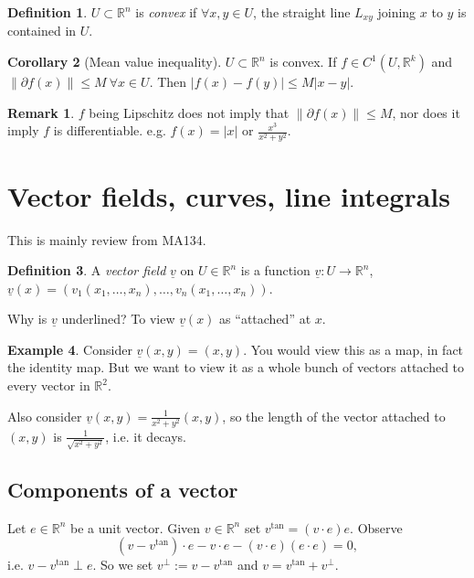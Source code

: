 \documentclass[a4paper]{article}
\theoremstyle{definition}
\newtheorem{defn}{Definition}[subsection]
\newtheorem{coro}[defn]{Corollary}
\newtheorem{eg}[defn]{Example}
\newtheorem*{remark}{Remark}
\begin{document}
\begin{defn}
$U\subset \mathbb R^n$ is \textit{convex} if $\forall x,y\in U$, the straight line $L_{xy}$ joining $x$ to $y$ is contained in $U$.
\end{defn}
\begin{coro}[Mean value inequality]
$U\subset \mathbb R^n$ is convex. If $f\in C^1(U,\mathbb R^k)$ and $\|\partial f(x)\| \leq M \ \forall x\in U$. Then $|f(x)-f(y)|\leq M|x-y|$.
\end{coro}
\begin{remark}
$f$ being Lipschitz does not imply that $\|\partial f(x)\| \leq M$, nor does it imply $f$ is differentiable. e.g. $f(x)=|x|$ or $\frac{x^3}{x^2+y^2}$.
\end{remark}

\section{Vector fields, curves, line integrals}
This is mainly review from MA134.
\begin{defn}
A \textit{vector field} $\underline{v}$ on $U\in \mathbb R^n$ is a function $\underline{v}:U\rightarrow \mathbb R^n$, $\underline{v}(x)=\left(v_1(x_1,\ldots,x_n),\ldots,v_n(x_1,\ldots,x_n)\right)$.
\end{defn}
Why is $\underline{v}$ underlined? To view $\underline{v}(x)$ as ``attached'' at $x$.
\begin{eg}
Consider $\underline{v}(x,y)=(x,y).$ You would view this as a map, in fact the identity map. But we want to view it as a whole bunch of vectors attached to every vector in $\mathbb R^2$.
\begin{center}
\end{center}

Also consider $\underline{v}(x,y) = \frac{1}{x^2+y^2} (x,y)$, so the length of the vector attached to $(x,y)$ is $\frac{1}{\sqrt{x^2+y^2}}$, i.e. it decays.
\end{eg}

\subsection{Components of a vector}
Let $e\in \mathbb R^n$ be a unit vector. Given $v\in \mathbb R^n$ set $v^{\tan}= (v\cdot e) e$. Observe
\[
(v-v^{\tan})\cdot e - v\cdot e - (v\cdot e)(e\cdot e)=0,
\]
i.e. $v-v^{\tan} \perp e$. So we set $v^\perp :=v-v^{\tan}$ and $v=v^{\tan} + v^\perp$.
\begin{center}
\end{center}
\end{document}
